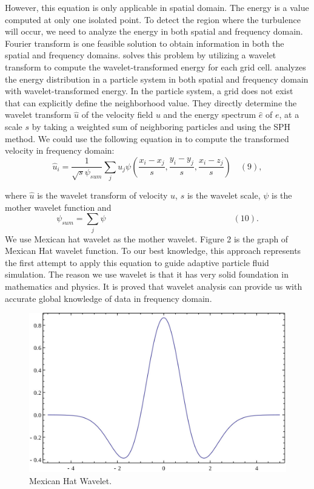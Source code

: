 However, this equation is only applicable in spatial domain. The
energy is a value computed at only one isolated point. To detect the
region where the turbulence will occur, we need to analyze the energy
in both spatial and frequency domain. Fourier transform is one
feasible solution to obtain information in both the spatial and
frequency domains. \cite{Kim:2008:WTF:1360612.1360649} solves this
problem by utilizing a wavelet transform to compute the
wavelet-transformed energy for each grid
cell. \cite{PG2011short:67-72:2011} analyzes the energy distribution
in a particle system in both spatial and frequency domain with
wavelet-transformed energy.  In the particle system, a grid does not
exist that can explicitly define the neighborhood value. They directly
determine the wavelet transform $\hat{u}$ of the velocity field $u$
and the energy spectrum $\hat{e}$ of $e$, at a scale $s$ by taking a
weighted sum of neighboring particles and using the SPH method. We
could use the following equation in
\cite{PG2011short:67-72:2011} to compute the transformed velocity in
frequency domain:
$$\hat{u}_i=\frac{1}{\sqrt{s}\psi_{sum}}\sum_{j}u_j\psi(\frac{x_i-x_j}{s},
\frac{y_i-y_j}{s}, \frac{x_i-z_j}{s}) \quad (9),$$

\noindent where $\hat{u}$ is the wavelet transform of velocity $u$, $s$ is the wavelet scale,
$\psi$ is the mother wavelet function and
$$\psi_{sum}=\sum_{j}\psi \quad \quad \quad \quad \quad \quad \quad \quad \quad \quad \quad \quad \quad \quad \quad(10).$$
\noindent We use Mexican hat wavelet as the mother wavelet. Figure 2 is the graph of Mexican Hat wavelet function. To our best knowledge, this
approach represents the
first attempt to apply this equation to guide adaptive particle fluid
simulation. The reason we use wavelet is that it has very solid
foundation in mathematics and physics. It is proved that wavelet analysis can provide us with accurate global knowledge of data in frequency domain.

\begin{figure}[htb]
  \centering
  \includegraphics[width=.8\linewidth]{figure2}
  \caption{\label{fig:firstExample}
           Mexican Hat Wavelet.}
\end{figure}

